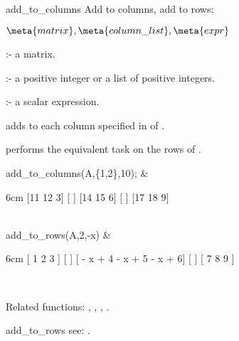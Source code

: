 \begin{Operator}{add_to_columns}
Add to columns, add to rows:

\begin{Syntax}
\(\meta{matrix},\meta{column\_list},\meta{expr}\)
\end{Syntax}

       :- a matrix. 

 :- a positive integer or a list of positive 
                       integers. 

         :- a scalar expression.

 adds  to each column specified in 
 of .  

 performs the equivalent task on the rows of 
.

\begin{Examples}

add_to_columns(A,\{1,2\},10); &
\begin{multilineoutput}{6cm}
[11  12  3]
[         ]
[14  15  6]
[         ]
[17  18  9]
\end{multilineoutput}\\

add_to_rows(A,2,-x) &
\begin{multilineoutput}{6cm} 
[   1         2         3    ]
[                            ]
[ - x + 4   - x + 5   - x + 6]
[                            ]
[   7         8         9    ]
\end{multilineoutput} \\
\end{Examples}

Related functions:
,  ,  , 
.

\end{Operator}


\begin{Operator}{add_to_rows}
 see:  .
\end{Operator}


